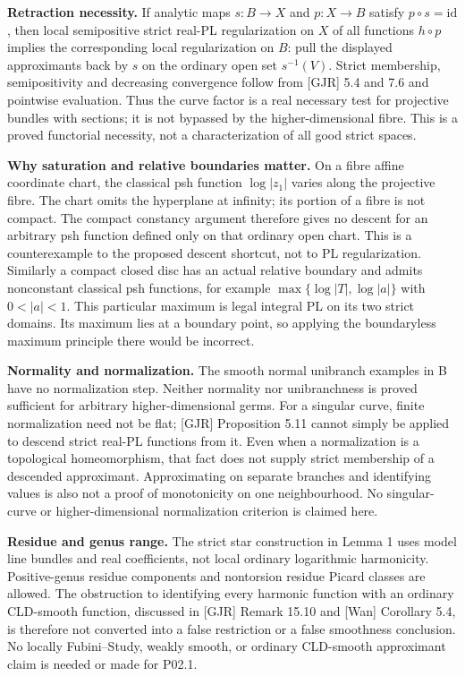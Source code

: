 \documentclass[
  11pt,
]{article}
\begin{document}
\textbf{Retraction necessity.} If analytic maps \(s:B\to X\) and
\(p:X\to B\) satisfy \(p\circ s=\mathrm{id}\), then local semipositive
strict real-PL regularization on \(X\) of all functions \(h\circ p\)
implies the corresponding local regularization on \(B\): pull the
displayed approximants back by \(s\) on the ordinary open set
\(s^{-1}(V)\). Strict membership, semipositivity and decreasing
convergence follow from {[}GJR{]} 5.4 and 7.6 and pointwise evaluation.
Thus the curve factor is a real necessary test for projective bundles
with sections; it is not bypassed by the higher-dimensional fibre. This
is a proved functorial necessity, not a characterization of all good
strict spaces.

\textbf{Why saturation and relative boundaries matter.} On a fibre
affine coordinate chart, the classical psh function \(\log|z_1|\) varies
along the projective fibre. The chart omits the hyperplane at infinity;
its portion of a fibre is not compact. The compact constancy argument
therefore gives no descent for an arbitrary psh function defined only on
that ordinary open chart. This is a counterexample to the proposed
descent shortcut, not to PL regularization. Similarly a compact closed
disc has an actual relative boundary and admits nonconstant classical
psh functions, for example \(\max\{\log|T|,\log|a|\}\) with \(0<|a|<1\).
This particular maximum is legal integral PL on its two strict domains.
Its maximum lies at a boundary point, so applying the boundaryless
maximum principle there would be incorrect.

\textbf{Normality and normalization.} The smooth normal unibranch
examples in B have no normalization step. Neither normality nor
unibranchness is proved sufficient for arbitrary higher-dimensional
germs. For a singular curve, finite normalization need not be flat;
{[}GJR{]} Proposition 5.11 cannot simply be applied to descend strict
real-PL functions from it. Even when a normalization is a topological
homeomorphism, that fact does not supply strict membership of a
descended approximant. Approximating on separate branches and
identifying values is also not a proof of monotonicity on one
neighbourhood. No singular-curve or higher-dimensional normalization
criterion is claimed here.

\textbf{Residue and genus range.} The strict star construction in Lemma
1 uses model line bundles and real coefficients, not local ordinary
logarithmic harmonicity. Positive-genus residue components and
nontorsion residue Picard classes are allowed. The obstruction to
identifying every harmonic function with an ordinary CLD-smooth
function, discussed in {[}GJR{]} Remark 15.10 and {[}Wan{]} Corollary
5.4, is therefore not converted into a false restriction or a false
smoothness conclusion. No locally Fubini--Study, weakly smooth, or
ordinary CLD-smooth approximant claim is needed or made for P02.1.
\end{document}
